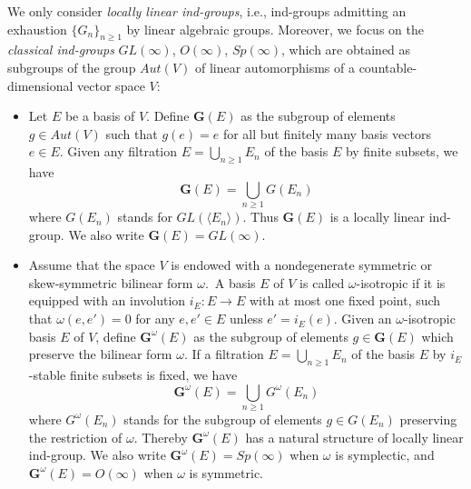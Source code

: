 \documentclass[12pt]{amsart}
\theoremstyle{definition}
\begin{document}
We only consider {\em locally linear ind-groups}, i.e., ind-groups admitting an exhaustion $\{G_n\}_{n\geq 1}$ by linear algebraic groups.
Moreover, we focus on the {\em classical ind-groups}
$GL(\infty)$, $O(\infty)$, $Sp(\infty)$, which are obtained as subgroups of the group $Aut(V)$ of linear automorphisms of a countable-dimensional vector space $V$:


\begin{itemize}
\item Let $E$ be a basis of $V$. Define $\mathbf{G}(E)$ as the subgroup of elements $g\in Aut(V)$ such that $g(e)=e$ for all but finitely many basis vectors $e\in E$. Given any filtration $E=\bigcup_{n\geq 1}E_n$ of the basis $E$ by finite subsets, we have \begin{equation}
\label{rel3}
\mathbf{G}(E)=\bigcup_{n\geq 1}G(E_n)
\end{equation}
where $G(E_n)$ stands for $GL(\langle E_n\rangle)$. Thus $\mathbf{G}(E)$ is a locally linear ind-group. We also write $\mathbf{G}(E)=GL(\infty)$.
\item Assume that the space $V$ is endowed with a nondegenerate symmetric or skew-symmetric bilinear form $\omega$.\ A basis $E$ of $V$ is called $\omega$-isotropic if it is equipped with an involution $i_E:E\to E$ with at most one fixed point, such that  $\omega(e,e')=0$ for any $e,e'\in E$ unless $e'=i_E(e)$. Given an $\omega$-isotropic basis $E$ of $V$, define $\mathbf{G}^\omega(E)$ as the subgroup of elements $g\in \mathbf{G}(E)$ which preserve the bilinear form $\omega$. If a filtration $E=\bigcup_{n\geq 1}E_n$ of the basis $E$ by $i_E$-stable finite subsets is fixed, we have
\begin{equation}
\label{rel4}
\mathbf{G}^\omega(E)=\bigcup_{n\geq 1}G^\omega(E_n)
\end{equation}
where $G^\omega(E_n)$ stands for the subgroup of elements $g\in G(E_n)$ preserving the restriction of $\omega$. Thereby $\mathbf{G}^\omega(E)$ has a natural structure of locally linear ind-group. We also write $\mathbf{G}^\omega(E)=Sp(\infty)$ when $\omega$ is symplectic, and $\mathbf{G}^\omega(E)=O(\infty)$ when $\omega$ is symmetric.
\end{itemize}
\end{document}
